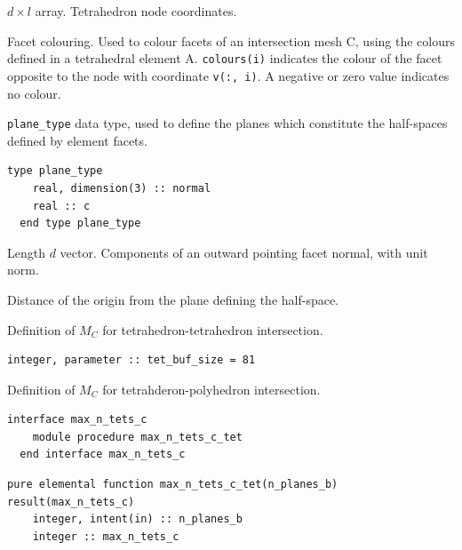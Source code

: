 \documentclass{article}
\begin{document}
\begin{description}[font=\ttfamily\bfseries,leftmargin=2.2\parindent,labelindent=1.7\parindent,noitemsep]
  \item[v] $d \times l$ array. Tetrahedron node coordinates.
  \item[colours] Facet colouring. Used to colour facets of an intersection mesh
    C, using the colours defined in a tetrahedral element A. \verb+colours(i)+
    indicates the colour of the facet opposite to the node with coordinate
    \verb+v(:, i)+. A negative or zero value indicates no colour.
\end{description}

\noindent \verb+plane_type+ data type, used to define the planes which
constitute the half-spaces defined by element facets.

\begin{lstlisting}[language=FORTRAN]
  type plane_type
    real, dimension(3) :: normal
    real :: c
  end type plane_type
\end{lstlisting}

\begin{description}[font=\ttfamily\bfseries,leftmargin=2.2\parindent,labelindent=1.7\parindent,noitemsep]
  \item[normal] Length $d$ vector. Components of an outward pointing facet
    normal, with unit norm.
  \item[c] Distance of the origin from the plane defining the half-space.
\end{description}

\noindent Definition of $M_C$ for tetrahedron-tetrahedron intersection.

\begin{lstlisting}[language=FORTRAN]
  integer, parameter :: tet_buf_size = 81
\end{lstlisting}

\noindent Definition of $M_C$ for tetrahderon-polyhedron intersection.

\begin{lstlisting}[language=FORTRAN]
  interface max_n_tets_c
    module procedure max_n_tets_c_tet
  end interface max_n_tets_c
\end{lstlisting}

\begin{lstlisting}[language=FORTRAN]
  pure elemental function max_n_tets_c_tet(n_planes_b) result(max_n_tets_c)
    integer, intent(in) :: n_planes_b    
    integer :: max_n_tets_c
\end{lstlisting}
\end{document}
